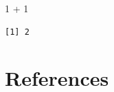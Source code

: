 \documentclass[
  letterpaper,
  DIV=11,
  numbers=noendperiod]{scrreprt}
\newenvironment{Shaded}{\begin{snugshade}}{\end{snugshade}}
\newcommand{\DecValTok}[1]{\textcolor[rgb]{0.68,0.00,0.00}{#1}}
\newcommand{\SpecialCharTok}[1]{\textcolor[rgb]{0.37,0.37,0.37}{#1}}
\newlength{\cslhangindent}
\newenvironment{CSLReferences}[2] %
 {\begin{list}{}{%
  \setlength{\itemindent}{0pt}
  \setlength{\leftmargin}{0pt}
  \setlength{\parsep}{0pt}
  \ifodd #1
   \setlength{\leftmargin}{\cslhangindent}
   \setlength{\itemindent}{-1\cslhangindent}
  \fi
  \setlength{\itemsep}{#2\baselineskip}}}
 {\end{list}}
\begin{document}
\begin{Shaded}
\begin{Highlighting}[]
\DecValTok{1} \SpecialCharTok{+} \DecValTok{1}
\end{Highlighting}
\end{Shaded}

\begin{verbatim}
[1] 2
\end{verbatim}


\chapter*{References}\label{references}


\label{refs}
\begin{CSLReferences}{0}{1}
\end{CSLReferences}
\end{document}
